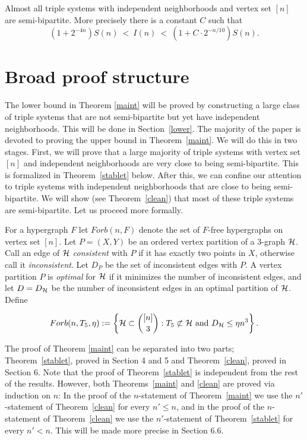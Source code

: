 \documentclass[11pt]{article}
\begin{document}
\begin{theorem}\label{maint}
Almost all triple systems with independent neighborhoods and vertex
set $[n]$ are semi-bipartite. More precisely there is a constant $C$
such that \begin{equation}\label{approxmain}  (1+
2^{-4n})S(n)\ <\ I(n)\ < \ (1+C\cdot
2^{-n/10})S(n).\end{equation}\end{theorem}

\section{Broad proof structure}

The lower bound in Theorem \ref{maint} will be proved by constructing a large class of triple systems that are not
 semi-bipartite but yet have independent neighborhoods. This will be done  in  Section~\ref{lower}.
  The majority of the paper is devoted to proving the upper bound in Theorem~\ref{maint}. We will do this in two stages.
   First, we will prove that a large majority of  triple systems with vertex set $[n]$
and independent neighborhoods are very close to being semi-bipartite.  This is formalized in Theorem~\ref{stablet} below.
 After this, we can confine our attention to triple systems with independent neighborhoods that are close to being semi-bipartite.
  We will show (see Theorem~\ref{clean}) that most of these triple systems are semi-bipartite.
Let us proceed more formally.

For a hypergraph $F$ let  $Forb(n, F)$ denote the set of   $F$-free
hypergraphs on vertex set $[n]$. Let $P=(X, Y)$ be an ordered vertex
partition of a 3-graph $\mathcal{H}$. Call an edge of $\mathcal{H}$ {\em consistent}
with $P$ if it has exactly two points in $X$, otherwise call it {\em
inconsistent}. Let $D_P$ be the set of inconsistent edges with $P$.
A vertex partition $P$ is {\em optimal} for $\mathcal{H}$ if it minimizes
the number of inconsistent edges, and let $D=D_{\mathcal{H}}$  be the number
of inconsistent edges in an optimal partition of $\mathcal{H}$. Define

$$Forb(n, T_5, \eta):=\left\{\mathcal{H} \subset \binom{[n]}{3}: T_5 \not\subset \mathcal{H}\hbox{ and } D_{\mathcal{H}}\le \eta n^3\right\}.$$


The  proof of Theorem \ref{maint} can be separated into two parts;
 Theorem~\ref{stablet}, proved in Section 4 and 5 and Theorem~\ref{clean},
 proved in Section 6. Note that the proof of Theorem~\ref{stablet} is independent from the rest of the
 results. However, both Theorems~\ref{maint} and \ref{clean} are proved via induction on $n$: In the proof of the $n$-statement of Theorem~\ref{maint} we use the $n'$-statement of Theorem~\ref{clean} for every $n'\le n$, and in the proof of the $n$-statement of Theorem~\ref{clean} we use the $n'$-statement of Theorem~\ref{stablet} for every $n'< n$.  This will be made more precise in Section 6.6.
\end{document}
